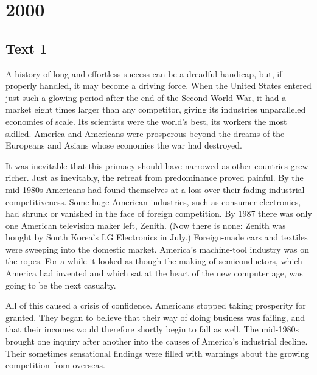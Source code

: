\section{2000}
\subsection{Text 1}
A history of long and effortless success can be a dreadful handicap, but, if properly handled, it may become a driving force. When the United States entered just such a glowing period after the end of the Second World War, it had a market eight times larger than any competitor, giving its industries unparalleled economies of scale. Its scientists were the world’s best, its workers the most skilled. America and Americans were prosperous beyond the dreams of the Europeans and Asians whose economies the war had destroyed.

It was inevitable that this primacy should have narrowed as other countries grew richer. Just as inevitably, the retreat from predominance proved painful. By the mid-1980s Americans had found themselves at a loss over their fading industrial competitiveness. Some huge American industries, such as consumer electronics, had shrunk or vanished in the face of foreign competition. By 1987 there was only one American television maker left, Zenith. (Now there is none: Zenith was bought by South Korea’s LG Electronics in July.) Foreign-made cars and textiles were sweeping into the domestic market. America’s machine-tool industry was on the ropes. For a while it looked as though the making of semiconductors, which America had invented and which sat at the heart of the new computer age, was going to be the next casualty.

All of this caused a crisis of confidence. Americans stopped taking prosperity for granted. They began to believe that their way of doing business was failing, and that their incomes would therefore shortly begin to fall as well. The mid-1980s brought one inquiry after another into the causes of America’s industrial decline. Their sometimes sensational findings were filled with warnings about the growing competition from overseas.

